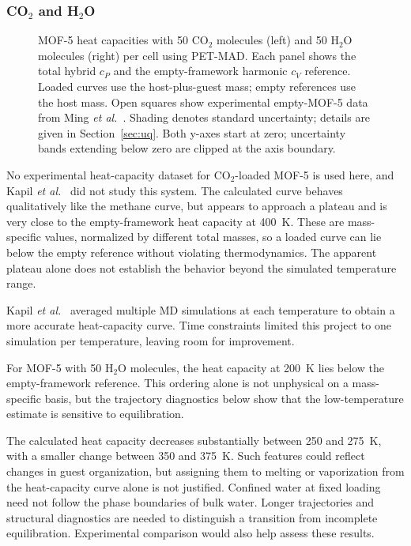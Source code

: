 \documentclass[12pt,a4paper]{article}
\numberwithin{equation}{section}
\begin{document}
\subsubsection{CO$_2$ and H$_2$O}
\label{sec:mof5-co2-results}

\begin{figure}[htbp]
  \centering
  \moffiveadditional
  \caption{MOF-5 heat capacities with 50 CO$_2$ molecules (left) and
  50 H$_2$O molecules (right) per cell using PET-MAD. Each panel shows the
  total hybrid $c_P$ and the empty-framework harmonic $c_V$ reference.
  Loaded curves use the host-plus-guest mass; empty references use the host
  mass. Open squares show experimental empty-MOF-5 data from
  Ming \emph{et al.}~\cite{ming2014mof5}. Shading denotes standard uncertainty; details are given in
  Section~\ref{sec:uq}. Both y-axes start at zero;
  uncertainty bands extending below zero are clipped at the axis boundary.}
  \label{fig:results-mof5-additional}
  \label{fig:results-mof5-co2}
  \label{fig:results-mof5-h2o}
\end{figure}

No experimental heat-capacity dataset for CO$_2$-loaded MOF-5 is used
here, and Kapil \emph{et al.}~\cite{kapil2019} did not study this system.
The calculated curve behaves qualitatively like the methane curve, but
appears to approach a plateau and is very close to the empty-framework
heat capacity at \SI{400}{K}. These are mass-specific values, normalized
by different total masses, so a loaded curve can lie below the empty
reference without violating thermodynamics. The apparent plateau alone
does not establish the behavior beyond the simulated temperature range.

Kapil \emph{et al.}~\cite{kapil2019} averaged multiple MD simulations
at each temperature to obtain a more accurate heat-capacity curve.
Time constraints limited this project to one simulation per temperature,
leaving room for improvement.

For MOF-5 with 50 H$_2$O molecules, the heat capacity at \SI{200}{K}
lies below the empty-framework reference. This ordering alone is not
unphysical on a mass-specific basis, but the trajectory diagnostics below
show that the low-temperature estimate is sensitive to equilibration.

The calculated heat capacity decreases substantially between 250 and
\SI{275}{K}, with a smaller change between 350 and \SI{375}{K}.
Such features could reflect changes in guest organization, but assigning
them to melting or vaporization from the heat-capacity curve alone is not
justified. Confined water at fixed loading need not follow the phase
boundaries of bulk water. Longer trajectories and structural diagnostics
are needed to distinguish a transition from incomplete equilibration.
Experimental comparison would also help assess these results.
\end{document}

